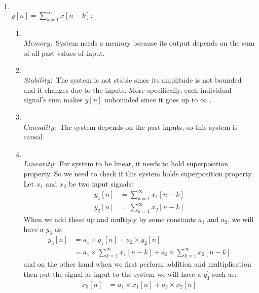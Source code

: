 \documentclass[10pt,a4paper, margin=1in]{article}
\begin{document}
\begin{enumerate}
\begin{enumerate}
    \newpage
    \item %
        \\$y[n] = \sum_{k=1}^{\infty} x[n - k] :$   
        \\
        \begin{enumerate}
            \item
            \\$Memory: $
            System needs a memory because its output depends on the sum of all past values of input.
            \\
            \item
            \\$Stability: $
            The system is not stable since its amplitude is not bounded and it changes due to the inputs. More specifically, each individual signal's sum makes $y[n]$ unbounded since it goes up to $\infty$ .
            \\
            \item
            \\$Causality: $
            The system depends on the past inputs, so this system is causal.
            \\
            \item 
            \\$Linearity: $
            For system to be linear, it needs to hold superposition property. So we need to check if this system holds superposition property. Let $x_1$ and $x_2$ be two input signals:
                \begin{align*}
                    y_1[n] & = \sum_{k=1}^{\infty} x_1[n - k] 
                    \\y_2[n] & = \sum_{k=1}^{\infty} x_2[n - k]
                \end{align*}
                When we add these up and multiply by some constants $a_1$ and $a_2$, we will have a $y_3$ as:
                \begin{align*}
                    y_3[n] &= a_1 \times y_1[n] + a_2 \times y_2[n] 
                    \\&= a_1 \times \sum_{k=1}^{\infty} x_1[n - k] + a_2 \times \sum_{k=1}^{\infty} x_2[n - k]
                \end{align*}
                and on the other hand when we first perform addition and multiplication then put the signal as input to the system we will have a $y_3^{'}$ such as:
                \begin{align*}
                    x_3[n] &= a_1\times x_1[n] + a_2\times x_2[n] 

\end{align*}
\end{enumerate}
\end{enumerate}
\end{enumerate}
\end{document}
